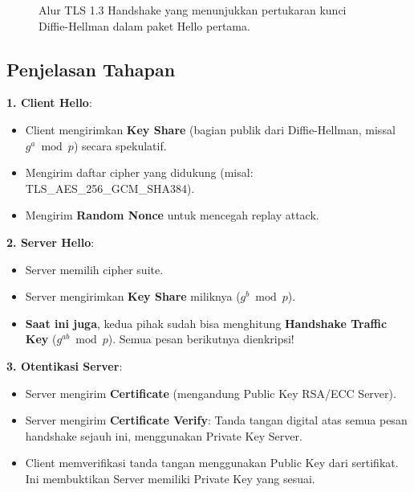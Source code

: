 \begin{figure}[htbp]
  \caption{Alur TLS 1.3 Handshake yang menunjukkan pertukaran kunci Diffie-Hellman dalam paket Hello pertama.}
\end{figure}

\subsection{Penjelasan Tahapan}

\textbf{1. Client Hello}:
\begin{itemize}
  \item Client mengirimkan \textbf{Key Share} (bagian publik dari Diffie-Hellman, missal $g^a \bmod p$) secara spekulatif.
  \item Mengirim daftar cipher yang didukung (misal: TLS\_AES\_256\_GCM\_SHA384).
  \item Mengirim \textbf{Random Nonce} untuk mencegah replay attack.
\end{itemize}

\textbf{2. Server Hello}:
\begin{itemize}
  \item Server memilih cipher suite.
  \item Server mengirimkan \textbf{Key Share} miliknya ($g^b \bmod p$).
  \item \textbf{Saat ini juga}, kedua pihak sudah bisa menghitung \textbf{Handshake Traffic Key} ($g^{ab} \bmod p$). Semua pesan berikutnya dienkripsi!
\end{itemize}

\textbf{3. Otentikasi Server}:
\begin{itemize}
  \item Server mengirim \textbf{Certificate} (mengandung Public Key RSA/ECC Server).
  \item Server mengirim \textbf{Certificate Verify}: Tanda tangan digital atas semua pesan handshake sejauh ini, menggunakan Private Key Server.
  \item Client memverifikasi tanda tangan menggunakan Public Key dari sertifikat. Ini membuktikan Server memiliki Private Key yang sesuai.
\end{itemize}

